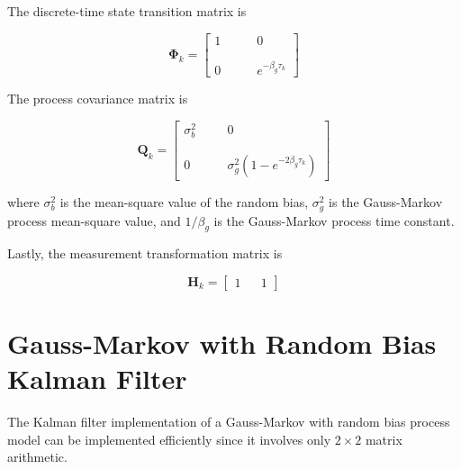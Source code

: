 \documentclass[12pt]{article}
\begin{document}
The discrete-time state transition matrix is

\begin{equation}
    \mathbf{\Phi}_k = 
    \begin{bmatrix}
    1  & \phantom{m} &  0 \\
    \phantom{m} \\
    0  & \phantom{m} &  e^{- \beta_g \tau_k}
    \end{bmatrix}
    \label{eq:GMRB-state-transition}
\end{equation}

The process covariance matrix is

\begin{equation}
    \mathbf{Q}_k = 
    \begin{bmatrix}
    \sigma_b^2  & \phantom{m} &  0 \\
    \phantom{m} \\
    0  & \phantom{m} &  \sigma_g^2 \left ( 1 - e^{-2 \beta_g \tau_k} \right )
    \end{bmatrix}
    \label{eq:GMRB-process-Q}
\end{equation}

where $\sigma_b^2$ is the mean-square value of the random bias, $\sigma_g^2$ is the
Gauss-Markov process mean-square value, and $1 / \beta_g$ is the Gauss-Markov process
time constant.

Lastly, the measurement transformation matrix is

\begin{equation}
    \mathbf{H}_k = 
    \begin{bmatrix}
    1  & &  1
    \end{bmatrix}
    \label{eq:GMRB-measurement-H}
\end{equation}



%
%

\clearpage
\section{Gauss-Markov with Random Bias Kalman Filter}

The Kalman filter implementation of a Gauss-Markov with random bias process model can be
implemented efficiently since it involves only $2 \times 2$ matrix arithmetic.
\end{document}
